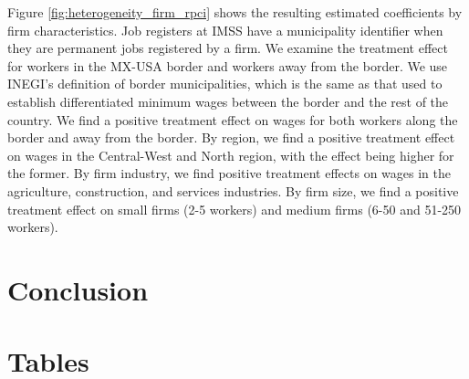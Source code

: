 \documentclass[oneside,11pt]{article}
\begin{document}
Figure \ref{fig:heterogeneity_firm_rpci} shows the resulting estimated coefficients by firm characteristics. Job registers at IMSS have a municipality identifier when they are permanent jobs registered by a firm. We examine the treatment effect for workers in the MX-USA border and workers away from the border. We use INEGI's definition of border municipalities, which is the same as that used to establish differentiated minimum wages between the border and the rest of the country. We find a positive treatment effect on wages for both workers along the border and away from the border. By region, we find a positive treatment effect on wages in the Central-West and North region, with the effect being higher for the former. By firm industry, we find positive treatment effects on wages in the agriculture, construction, and services industries. By firm size, we find a positive treatment effect on small firms (2-5 workers) and medium firms (6-50 and 51-250 workers).

\section{Conclusion} \label{conclusion}


\newpage


\clearpage

%
%
%




\clearpage
\singlespacing

\section{Tables}
\end{document}
